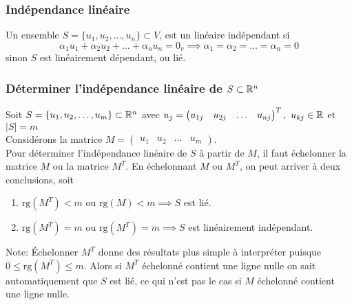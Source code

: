 \subsubsection{Indépendance linéaire}
\begin{definition}
      Un ensemble $S = \{ u_1, u_2, \ldots, u_n \} \subset V$, est un linéaire indépendant si
      \[
            \alpha_1 u_1 + \alpha_2 u_2 + \ldots + \alpha_n u_n = 0_v \implies \alpha_1 = \alpha_2 = \ldots = \alpha_n = 0
      \]
      sinon $S$ est linéairement dépendant, ou lié.
\end{definition}

\subsubsection{Déterminer l'indépendance linéaire de \texorpdfstring{$S \subset \mathbb{R}^n$}{S subset of Rn}}
\noindent
Soit $S = \{ u_1, u_2, \ldots, u_m \} \subset \mathbb{R}^n$ avec $u_j = \begin{pmatrix}
            u_{1j} & u_{2j} & \dots  & u_{nj} \end{pmatrix}^T, \ u_{kj} \in \mathbb{R}$ et $|S| = m$ \\
Considérons la matrice $M = \begin{pmatrix} u_1 & u_2 & \ldots & u_m \end{pmatrix}$. \\
Pour déterminer l'indépendance linéaire de $S$ à partir de $M$, il faut
échelonner la matrice $M$ ou la matrice $M^T$. En échelonnant $M$ ou $M^T$, on peut arriver 
à deux conclusions, soit \begin{enumerate}[1.]
      \item $\text{rg}(M^T) < m$ ou $\text{rg}(M) < m \implies S$ est lié.
      \item $\text{rg}(M^T) = m$ ou $\text{rg}(M^T) = m \implies S$ est linéairement indépendant.
\end{enumerate}
Note: Échelonner $M^T$ donne des résultats plus simple à interpréter puisque 
$0 \leq \text{rg}(M^T) \leq m$. Alors si $M^T$ échelonné contient une ligne nulle
on sait automatiquement que $S$ est lié, ce qui n'est pas le cas si $M$ échelonné
contient une ligne nulle.


